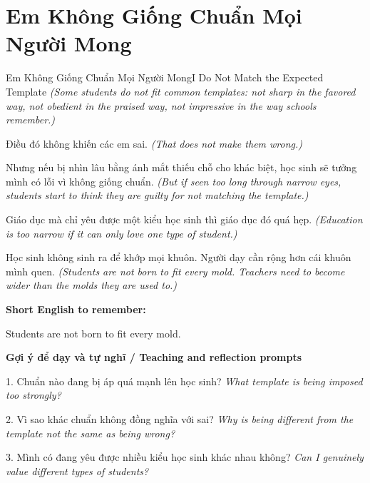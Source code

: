 \section{Em Không Giống Chuẩn Mọi Người Mong}
\begin{truyen}{Em Không Giống Chuẩn Mọi Người Mong}{I Do Not Match the Expected Template}
\textit{(Some students do not fit common templates: not sharp in the favored way, not obedient in the praised way, not impressive in the way schools remember.)}

Điều đó không khiến các em sai.
\textit{(That does not make them wrong.)}

Nhưng nếu bị nhìn lâu bằng ánh mắt thiếu chỗ cho khác biệt, học sinh sẽ tưởng mình có lỗi vì không giống chuẩn.
\textit{(But if seen too long through narrow eyes, students start to think they are guilty for not matching the template.)}

Giáo dục mà chỉ yêu được một kiểu học sinh thì giáo dục đó quá hẹp.
\textit{(Education is too narrow if it can only love one type of student.)}

\end{truyen}

\begin{baihoc}
Học sinh không sinh ra để khớp mọi khuôn. Người dạy cần rộng hơn cái khuôn mình quen.
\textit{(Students are not born to fit every mold. Teachers need to become wider than the molds they are used to.)}
\end{baihoc}

\begin{ghinhoanh}
\textbf{Short English to remember:}

Students are not born to fit every mold.

\end{ghinhoanh}

\begin{tuhocnhanh}
\textbf{Gợi ý để dạy và tự nghĩ / Teaching and reflection prompts}

1. Chuẩn nào đang bị áp quá mạnh lên học sinh? \textit{What template is being imposed too strongly?}

2. Vì sao khác chuẩn không đồng nghĩa với sai? \textit{Why is being different from the template not the same as being wrong?}

3. Mình có đang yêu được nhiều kiểu học sinh khác nhau không? \textit{Can I genuinely value different types of students?}
\end{tuhocnhanh}
\ngancach

